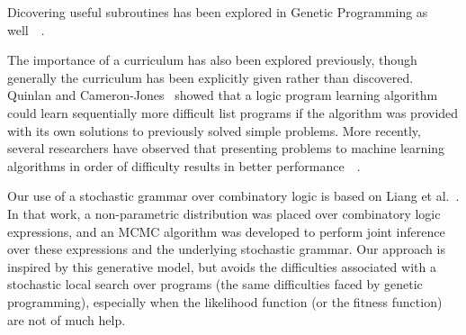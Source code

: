 \documentclass{article}
\begin{document}
Dicovering useful subroutines has been explored in Genetic
Programming as
well~\cite{DBLP:conf/foga/Koza92}~\cite{DBLP:conf/ices/KozaBAK96}. 

The importance of a curriculum has also been explored previously,
though generally the curriculum has been explicitly given rather than
discovered. Quinlan and Cameron-Jones~\cite{Quinlan93foil:a} showed
that a logic program learning algorithm could learn sequentially more
difficult list programs if the algorithm was provided with its own
solutions to previously solved simple problems. More recently, several
researchers have observed that presenting problems to machine learning
algorithms in order of difficulty results in better
performance~\cite{Krueger2009380}~\cite{DBLP:conf/icml/BengioLCW09}.

Our use of a stochastic grammar over combinatory logic is based on
Liang et al.~\cite{liang10programs}. In that work, a non-parametric
distribution was placed over combinatory logic expressions, and an
MCMC algorithm was developed to perform joint inference over these
expressions and the underlying stochastic grammar. Our approach is
inspired by this generative model, but avoids the difficulties
associated with a stochastic local search over programs (the same
difficulties faced by genetic programming), especially when the
likelihood function (or the fitness function) are not of much help.



\end{document}
